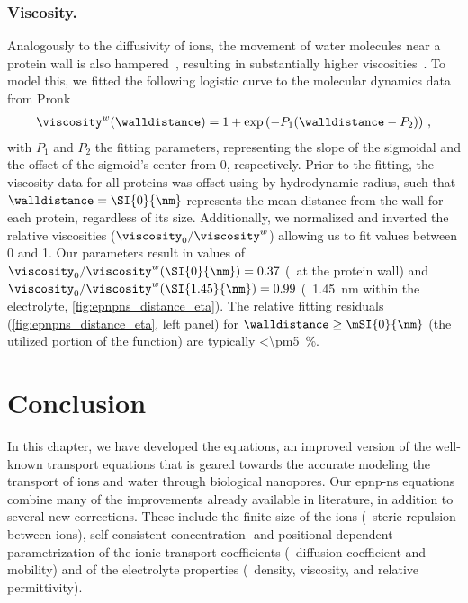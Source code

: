 \subsubsection{Viscosity.}
%
Analogously to the diffusivity of ions, the movement of water molecules near a protein wall is also
hampered~\cite{Makarov-1998}, resulting in substantially higher viscosities~\cite{Pronk-2014}. To model this,
we fitted the following logistic curve to the molecular dynamics data from Pronk \etal{}~\cite{Pronk-2014}
%
\begin{align}\label{eq:epnpns_distance_eta}
  \viscosity^w (\walldistance) = 1 + \exp{ \left( -P_1 (\walldistance - P_2) \right) }
  \text{ ,}
\end{align}
%
with $P_1$ and $P_2$ the fitting parameters, representing the slope of the sigmoidal and the offset of the
sigmoid's center from 0, respectively. Prior to the fitting, the viscosity data for all proteins was offset
using by hydrodynamic radius, such that $\walldistance = \SI{0}{\nm}$ represents the mean distance from the
wall for each protein, regardless of its size. Additionally, we normalized and inverted the relative
viscosities ($\viscosity_0 / \viscosity^w$) allowing us to fit values between 0 and 1. Our parameters result
in values of $\viscosity_0 / \viscosity^w (\SI{0}{\nm}) = 0.37$ (\ie~at the protein wall) and $\viscosity_0
/ \viscosity^w (\SI{1.45}{\nm}) = 0.99$ (\ie~\SI{1.45}{\nm} within the electrolyte,
\cref{fig:epnpns_distance_eta}). The relative fitting residuals (\cref{fig:epnpns_distance_eta}, left panel)
for $\walldistance \ge \mSI{0}{\nm}$ (the utilized portion of the function) are typically
\SI{<\pm5}{\percent}.





\section{Conclusion}
%
\label{sec:epnp-ns:conclusion}
%

In this chapter, we have developed the  equations, an improved version of the well-known
transport equations that is geared towards the accurate modeling the transport of ions and water through
biological nanopores. Our \gls{epnp-ns} equations combine many of the improvements already available in
literature, in addition to several new corrections. These include the finite size of the ions (\ie~steric
repulsion between ions), self-consistent concentration- and positional-dependent parametrization of the ionic
transport coefficients (\ie~diffusion coefficient and mobility) and of the electrolyte properties
(\ie~density, viscosity, and relative permittivity).

